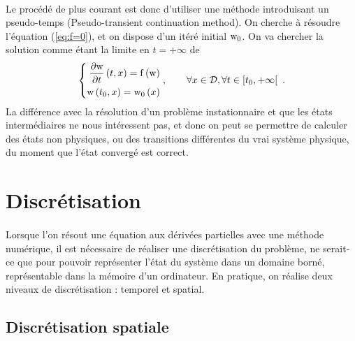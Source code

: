		\paragraph{}
		Le procédé de plus courant est donc d'utiliser une méthode introduisant un pseudo-temps (Pseudo-transient continuation method).
		On cherche à résoudre l'équation (\ref{eq:f=0}), et on dispose d'un itéré initial $\textup{w}_0$.
		On va chercher la solution comme étant la limite en $t = +\infty$ de
		\begin{equation}\label{eq:edp}
			\left\{\begin{aligned}
				\frac{\partial\textup{w}}{\partial t}\left(t, x\right) = \operatorname{f}\left(\textup{w}\right) \\
				\textup{w}\left(t_0, x\right) = \textup{w}_0\left(x\right)
			\end{aligned}\right.,\qquad \forall x\in\mathcal{D}, \forall t\in\left[t_0, +\infty\right[\ .
		\end{equation}
		La différence avec la résolution d'un problème instationnaire et que les états intermédiaires ne nous intéressent pas, et donc on peut se permettre de calculer des états non physiques, ou des transitions différentes du vrai système physique, du moment que l'état convergé est correct.


\section{Discrétisation}

	\paragraph{}
	Lorsque l'on résout une équation aux dérivées partielles avec une méthode numérique, il est nécessaire de réaliser une discrétisation du problème, ne serait-ce que pour pouvoir représenter l'état du système dans un domaine borné, représentable dans la mémoire d'un ordinateur.
	En pratique, on réalise deux niveaux de discrétisation : temporel et spatial.


	\subsection{Discrétisation spatiale}

